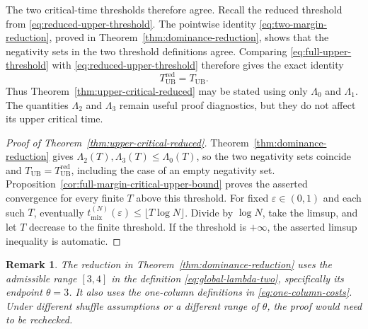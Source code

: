 \documentclass[11pt]{article}
\numberwithin{equation}{section}
\newtheorem{remark}[remark]{Remark}
\newcommand{\1}{\mathbf 1}
\newcommand{\UB}{\mathrm{UB}}
\begin{document}
The two critical-time thresholds therefore agree.
Recall the reduced threshold from \eqref{eq:reduced-upper-threshold}.
The pointwise identity \eqref{eq:two-margin-reduction}, proved in
Theorem~\ref{thm:dominance-reduction}, shows that the negativity sets in the two
threshold definitions agree.  Comparing \eqref{eq:full-upper-threshold} with
\eqref{eq:reduced-upper-threshold} therefore gives the exact identity
\begin{equation}
\label{eq:upper-threshold-identity}
  T_{\UB}^{\mathrm{red}}=T_{\UB}.
\end{equation}
Thus Theorem~\ref{thm:upper-critical-reduced} may be stated using only
$\Lambda_0$ and $\Lambda_1$.  The quantities $\Lambda_2$ and $\Lambda_3$
remain useful proof diagnostics, but they do not affect its upper critical
time.

\begin{proof}[Proof of Theorem~\ref{thm:upper-critical-reduced}]
Theorem~\ref{thm:dominance-reduction} gives
$\Lambda_2(T),\Lambda_3(T)\le\Lambda_0(T)$, so the two negativity
sets coincide and $T_{\UB}=T_{\UB}^{\mathrm{red}}$, including the
case of an empty negativity set.  Proposition~\ref{cor:full-margin-critical-upper-bound} proves
the asserted convergence for every finite $T$ above this threshold.
For fixed $\varepsilon\in(0,1)$ and each such $T$, eventually
$t_{\mathrm{mix}}^{(N)}(\varepsilon)\le\lfloor T\log N\rfloor$.
Divide by $\log N$, take the limsup, and let $T$ decrease to the
finite threshold.  If the threshold is $+\infty$, the asserted
limsup inequality is automatic.
\end{proof}

\begin{remark}
\label{rem:dominance-reduction-assumptions}
The reduction in Theorem~\ref{thm:dominance-reduction} uses the admissible range
$[3,4]$ in the definition \eqref{eq:global-lambda-two}, specifically its
endpoint $\theta=3$.  It also uses the one-column definitions in
\eqref{eq:one-column-costs}.  Under different shuffle assumptions or a
different range of $\theta$, the proof would need to be rechecked.
\end{remark}
\end{document}

